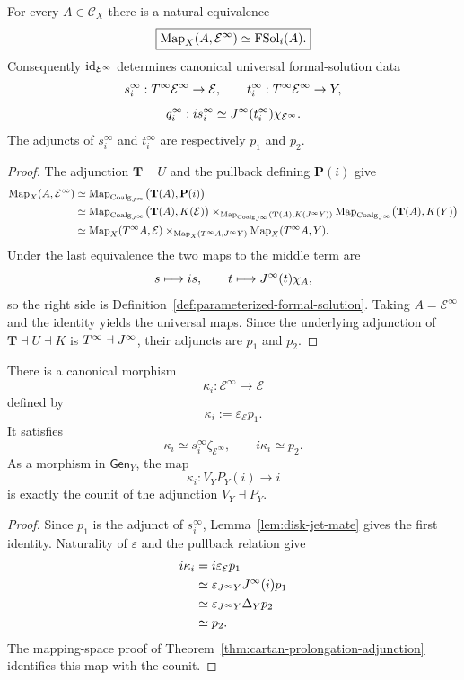 \begin{theorem}
\label{thm:universal-formal-solutions}
For every $A\in\mathcal C_X$ there is a natural equivalence
\[
\boxed{
    \operatorname{Map}_X(A,\mathcal E^\infty)
    \simeq
    \operatorname{FSol}_i(A).
}
\]
Consequently $\operatorname{id}_{\mathcal E^\infty}$ determines canonical universal formal-solution data
\[
    s_i^\infty:T^{\infty}\mathcal E^\infty\to\mathcal E,
    \qquad
    t_i^\infty:T^{\infty}\mathcal E^\infty\to Y,
\]
\[
    q_i^\infty:
    is_i^\infty
    \simeq
    J^{\infty}(t_i^\infty)\chi_{\mathcal E^\infty}.
\]
The adjuncts of $s_i^\infty$ and $t_i^\infty$ are respectively $p_1$ and $p_2$.
\end{theorem}

\begin{proof}
The adjunction $\mathbf T\dashv U$ and the pullback defining $\mathbf P(i)$ give
\[
\begin{aligned}
\operatorname{Map}_X(A,\mathcal E^\infty)
&\simeq
\operatorname{Map}_{\operatorname{Coalg}_{J^{\infty}}}\bigl(\mathbf T(A),\mathbf P(i)\bigr)\\
&\simeq
\operatorname{Map}_{\operatorname{Coalg}_{J^{\infty}}}\bigl(\mathbf T(A),K(\mathcal E)\bigr)
\times_{\operatorname{Map}_{\operatorname{Coalg}_{J^{\infty}}}(\mathbf T(A),K(J^{\infty} Y))}
\operatorname{Map}_{\operatorname{Coalg}_{J^{\infty}}}\bigl(\mathbf T(A),K(Y)\bigr)\\
&\simeq
\operatorname{Map}_X(T^{\infty} A,\mathcal E)
\times_{\operatorname{Map}_X(T^{\infty} A,J^{\infty} Y)}
\operatorname{Map}_X(T^{\infty} A,Y).
\end{aligned}
\]
Under the last equivalence the two maps to the middle term are
\[
    s\longmapsto is,
    \qquad
    t\longmapsto J^{\infty}(t)\chi_A,
\]
so the right side is Definition~\ref{def:parameterized-formal-solution}.  Taking $A=\mathcal E^\infty$ and the identity yields the universal maps.  Since the underlying adjunction of $\mathbf T\dashv U\dashv K$ is $T^{\infty}\dashv J^{\infty}$, their adjuncts are $p_1$ and $p_2$.
\end{proof}

\begin{proposition}
\label{prop:prolongation-inclusion}
There is a canonical morphism
\[
    \kappa_i:\mathcal E^\infty\longrightarrow\mathcal E
\]
defined by
\[
    \boxed{\kappa_i:=\varepsilon_{\mathcal E}p_1.}
\]
It satisfies
\[
    \kappa_i\simeq s_i^\infty\zeta_{\mathcal E^\infty},
    \qquad
    i\kappa_i\simeq p_2.
\]
As a morphism in $\mathsf{Gen}_Y$, the map
\[
    \kappa_i:V_YP_Y(i)\longrightarrow i
\]
is exactly the counit of the adjunction $V_Y\dashv P_Y$.
\end{proposition}

\begin{proof}
Since $p_1$ is the adjunct of $s_i^\infty$, Lemma~\ref{lem:disk-jet-mate} gives the first identity.  Naturality of $\varepsilon$ and the pullback relation give
\[
\begin{aligned}
i\kappa_i
&=i\varepsilon_{\mathcal E}p_1\\
&\simeq\varepsilon_{J^{\infty} Y}J^{\infty}(i)p_1\\
&\simeq\varepsilon_{J^{\infty} Y}\Delta_Yp_2\\
&\simeq p_2.
\end{aligned}
\]
The mapping-space proof of Theorem~\ref{thm:cartan-prolongation-adjunction} identifies this map with the counit.
\end{proof}

